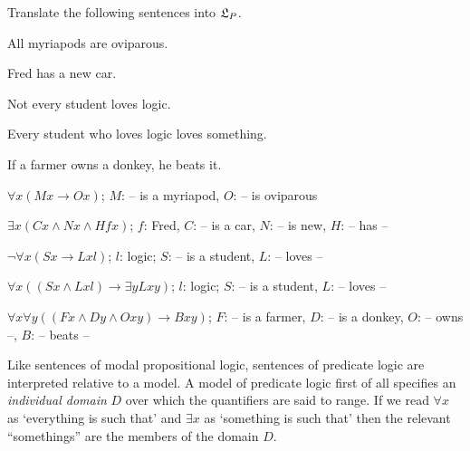 \begin{exercise}
  Translate the following sentences into $\mathfrak{L}_P$.
  \begin{exlist}
  \item All myriapods are oviparous.
  \item Fred has a new car.
  \item Not every student loves logic.
  \item Every student who loves logic loves something.
  \item If a farmer owns a donkey, he beats it.
  \end{exlist}
\end{exercise}
\begin{solution}
  \begin{sollist}
  \item $\forall x (Mx \to Ox)$; \qquad $M$: -- is a myriapod, $O$: -- is oviparous 
  \item $\exists x (Cx \land Nx \land Hfx)$; \qquad $f$: Fred, $C$: -- is a car, $N$: -- is new, $H$: -- has --
  \item $\neg\forall x (Sx \to Lxl)$; \qquad $l$: logic; $S$: -- is a student, $L$: -- loves --
  \item $\forall x ((Sx \land Lxl) \to \exists y Lxy)$; \qquad $l$: logic; $S$: -- is a student, $L$: -- loves --
  \item $\forall x \forall y((Fx \land Dy \land Oxy) \to Bxy)$; \qquad $F$: -- is a farmer, $D$: -- is a donkey, $O$: -- owns --, $B$: -- beats --
  \end{sollist}
\end{solution}

Like sentences of modal propositional logic, sentences of predicate logic are
interpreted relative to a model. A model of predicate logic first of all
specifies an \emph{individual domain} $D$ over which the quantifiers are said to
range. If we read $\forall x$ as `everything is such that' and $\exists x$ as
`something is such that' then the relevant ``somethings'' are the members of the
domain $D$.

